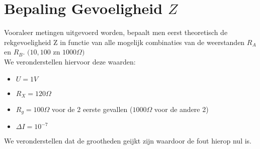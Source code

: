 \section{Bepaling Gevoeligheid $Z$}
Vooraleer metingen uitgevoerd worden, bepaalt men eerst theoretisch de rekgevoeligheid Z
in functie van alle mogelijk combinaties van de weerstanden $R_{A}$ en $R_{B}$. 
$(10, 100$ zn $1000{\Omega})$
\\

 We veronderstellen hiervoor deze waarden:

\begin{itemize}
    \item $U = 1 V$
    \item $R_X = 120 \Omega$
    \item $R_g = 100 \Omega$ voor de 2 eerste gevallen ($1000 \Omega$ voor de andere 2)
    \item $\Delta I = 10^{-7}$
\end{itemize}

We veronderstellen dat de grootheden geijkt zijn waardoor de fout hierop nul is.
\\

